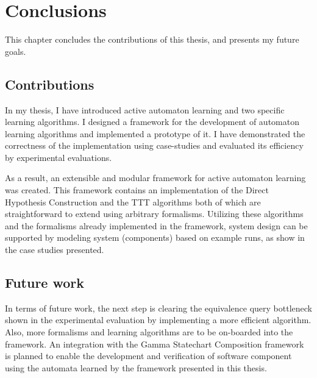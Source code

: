 \chapter{Conclusions}
This chapter concludes the contributions of this thesis, and presents my future goals.

\section{Contributions}
In my thesis, I have introduced active automaton learning and two specific learning algorithms. I designed a framework for the development of automaton learning algorithms and implemented a prototype of it. I have demonstrated the correctness of the implementation using case-studies and evaluated its efficiency by experimental evaluations.

As a result, an extensible and modular framework for active automaton learning was created. This framework contains an implementation of the Direct Hypothesis Construction and the TTT algorithms both of which are straightforward to extend using arbitrary formalisms. Utilizing these algorithms and the formalisms already implemented in the framework, system design can be supported by modeling system (components) based on example runs, as show in the case studies presented.

\section{Future work}
In terms of future work, the next step is clearing the equivalence query bottleneck shown in the experimental evaluation by implementing a more efficient algorithm. Also, more formalisms and learning algorithms are to be on-boarded into the framework. An integration with the Gamma Statechart Composition framework\cite{DBLP:conf/icse/MolnarGVMV18} is planned to enable the development and verification of software component using the automata learned by the framework presented in this thesis.